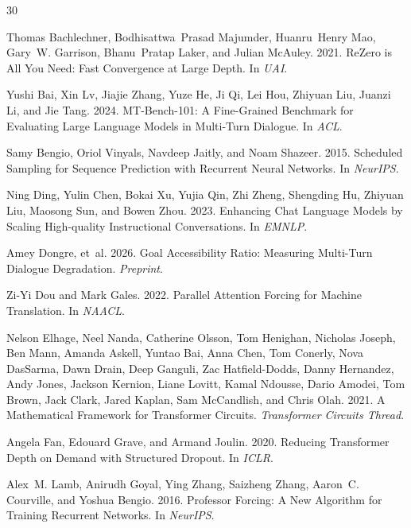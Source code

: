\documentclass[11pt,a4paper]{article}
\begin{document}
\begin{thebibliography}{30}

Thomas Bachlechner, Bodhisattwa~Prasad Majumder, Huanru~Henry Mao, Gary~W. Garrison, Bhanu~Pratap Laker, and Julian McAuley. 2021. ReZero is All You Need: Fast Convergence at Large Depth. In \emph{UAI}.

Yushi Bai, Xin Lv, Jiajie Zhang, Yuze He, Ji Qi, Lei Hou, Zhiyuan Liu, Juanzi Li, and Jie Tang. 2024. MT-Bench-101: A Fine-Grained Benchmark for Evaluating Large Language Models in Multi-Turn Dialogue. In \emph{ACL}.

Samy Bengio, Oriol Vinyals, Navdeep Jaitly, and Noam Shazeer. 2015. Scheduled Sampling for Sequence Prediction with Recurrent Neural Networks. In \emph{NeurIPS}.

Ning Ding, Yulin Chen, Bokai Xu, Yujia Qin, Zhi Zheng, Shengding Hu, Zhiyuan Liu, Maosong Sun, and Bowen Zhou. 2023. Enhancing Chat Language Models by Scaling High-quality Instructional Conversations. In \emph{EMNLP}.

Amey Dongre, et~al. 2026. Goal Accessibility Ratio: Measuring Multi-Turn Dialogue Degradation. \emph{Preprint}.

Zi-Yi Dou and Mark Gales. 2022. Parallel Attention Forcing for Machine Translation. In \emph{NAACL}.

Nelson Elhage, Neel Nanda, Catherine Olsson, Tom Henighan, Nicholas Joseph, Ben Mann, Amanda Askell, Yuntao Bai, Anna Chen, Tom Conerly, Nova DasSarma, Dawn Drain, Deep Ganguli, Zac Hatfield-Dodds, Danny Hernandez, Andy Jones, Jackson Kernion, Liane Lovitt, Kamal Ndousse, Dario Amodei, Tom Brown, Jack Clark, Jared Kaplan, Sam McCandlish, and Chris Olah. 2021. A Mathematical Framework for Transformer Circuits. \emph{Transformer Circuits Thread}.

Angela Fan, Edouard Grave, and Armand Joulin. 2020. Reducing Transformer Depth on Demand with Structured Dropout. In \emph{ICLR}.

Alex~M. Lamb, Anirudh Goyal, Ying Zhang, Saizheng Zhang, Aaron~C. Courville, and Yoshua Bengio. 2016. Professor Forcing: A New Algorithm for Training Recurrent Networks. In \emph{NeurIPS}.


\end{thebibliography}
\end{document}
